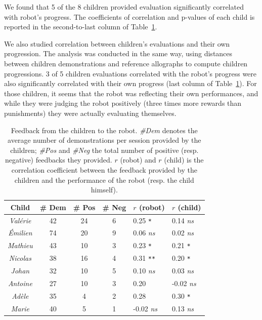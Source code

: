 \documentclass[conference]{IEEEtran}
\begin{document}
We found that 5 of the 8 children provided evaluation significantly correlated with robot's progress. The coefficients of correlation and p-values of each child is reported in the second-to-last column of Table~\ref{table:scores}.

We also studied correlation between children's evaluations and their own
progression. The analysis was conducted in the same way, using distances between children demonstrations and reference allographs to compute children progressions.
3 of 5 children evaluations correlated with the robot's progress were also significantly correlated with their own progress (last column of Table~\ref{table:scores}). For
those children, it seems that the robot was reflecting their own performances, and while they
were judging the robot positively (three times more rewards than punishments)
they were actually evaluating themselves.


\begin{table}
    \centering
    \caption{\footnotesize Feedback from the children to the robot. \emph{\#Dem}
        denotes the average number of demonstrations per session provided by the children;
        \emph{\#Pos} and \emph{\#Neg} the total number of positive (resp.
        negative) feedbacks they provided. $r$ (robot) and $r$ (child) is the correlation coefficient
        between the feedback provided by the children and the performance of the
        robot (resp. the child himself).}
    \begin{tabular}{ccccll}
        \toprule
        \bf Child      & \bf \# Dem & \bf \# Pos & \bf \# Neg & $r$ (robot) & $r$ (child) \\ \midrule
        \emph{Val\'erie} & 42           & 24              & 6               & 0.25 \small\tt ** & 0.14 \small\it ns\\ 
        \emph{\'Emilien} & 74           & 20              & 9               & 0.06 \small\it ns & 0.02 \small\it ns\\
        \emph{Mathieu} & 43           & 10              & 3               & 0.23 \small\tt ** & 0.21 \small\tt **\\
        \emph{Nicolas} & 38           & 16              & 4               & 0.31 \small\tt *** & 0.20 \small\tt **\\
        \emph{Johan}   & 32           & 10              & 5               & 0.10 \small\it ns & 0.03 \small\it ns\\
        \emph{Antoine} & 27           & 10              & 3               & 0.20 \small\tt * & -0.02 \small\it ns \\
        \emph{Ad\`ele}   & 35           & 4               & 2               & 0.28 \small\tt * & 0.30 \small\tt ** \\
        \emph{Marie}   & 40           & 5               & 1               & -0.02 \small\it ns & 0.13 \small\it ns\\ \bottomrule
    \end{tabular}

    \label{table:scores}
\end{table}
\end{document}
